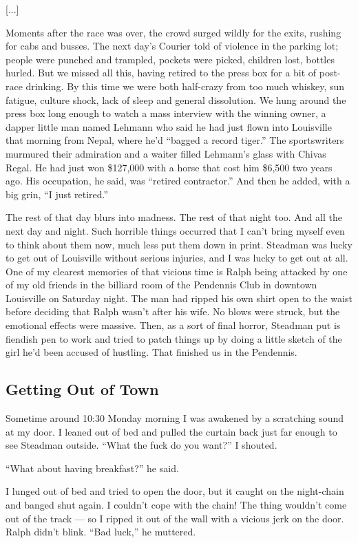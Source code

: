 \documentclass[10pt,a4paper]{article}
\begin{document}
[...]

Moments after the race was over, the crowd surged wildly for the exits, rushing for cabs and busses. The next day’s Courier told of violence in the parking lot; people were punched and trampled, pockets were picked, children lost, bottles hurled. But we missed all this, having retired to the press box for a bit of post-race drinking. By this time we were both half-crazy from too much whiskey, sun fatigue, culture shock, lack of sleep and general dissolution. We hung around the press box long enough to watch a mass interview with the winning owner, a dapper little man named Lehmann who said he had just flown into Louisville that morning from Nepal, where he’d “bagged a record tiger.” The sportswriters murmured their admiration and a waiter filled Lehmann’s glass with Chivas Regal. He had just won \$127,000 with a horse that cost him \$6,500 two years ago. His occupation, he said, was “retired contractor.” And then he added, with a big grin, “I just retired.”

The rest of that day blurs into madness. The rest of that night too. And all the next day and night. Such horrible things occurred that I can’t bring myself even to think about them now, much less put them down in print. Steadman was lucky to get out of Louisville without serious injuries, and I was lucky to get out at all. One of my clearest memories of that vicious time is Ralph being attacked by one of my old friends in the billiard room of the Pendennis Club in downtown Louisville on Saturday night. The man had ripped his own shirt open to the waist before deciding that Ralph wasn’t after his wife. No blows were struck, but the emotional effects were massive. Then, as a sort of final horror, Steadman put is fiendish pen to work and tried to patch things up by doing a little sketch of the girl he’d been accused of hustling. That finished us in the Pendennis.

\subsection{Getting Out of Town}

Sometime around 10:30 Monday morning I was awakened by a scratching sound at my door. I leaned out of bed and pulled the curtain back just far enough to see Steadman outside. “What the fuck do you want?” I shouted.

“What about having breakfast?” he said.

I lunged out of bed and tried to open the door, but it caught on the night-chain and banged shut again. I couldn’t cope with the chain! The thing wouldn’t come out of the track — so I ripped it out of the wall with a vicious jerk on the door. Ralph didn’t blink. “Bad luck,” he muttered.
\end{document}
